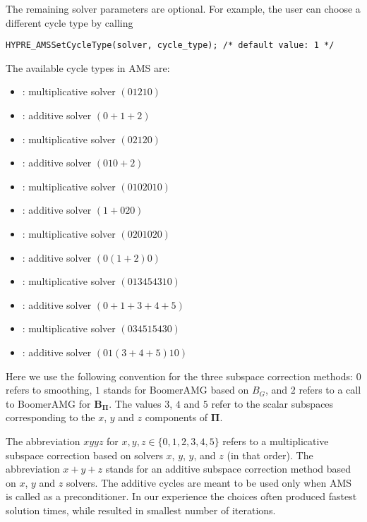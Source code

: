 The remaining solver parameters are optional.
For example, the user can choose a different cycle type by calling
\begin{display}\begin{verbatim}
HYPRE_AMSSetCycleType(solver, cycle_type); /* default value: 1 */
\end{verbatim}\end{display}

\noindent
The available cycle types in AMS are:
\begin{itemize}
\item {}: multiplicative solver $(01210)$
\item {}: additive solver $(0+1+2)$
\item {}: multiplicative solver $(02120)$
\item {}: additive solver $(010+2)$
\item {}: multiplicative solver $(0102010)$
\item {}: additive solver $(1+020)$
\item {}: multiplicative solver $(0201020)$
\item {}: additive solver $(0(1+2)0)$
\item {}: multiplicative solver $(013454310)$
\item {}: additive solver $(0+1+3+4+5)$
\item {}: multiplicative solver $(034515430)$
\item {}: additive solver $(01(3+4+5)10)$
\end{itemize}
Here we use the following convention for the
three subspace correction methods:
$0$ refers to smoothing, $1$ stands for BoomerAMG based on $B_G$, and
$2$ refers to a call to BoomerAMG for ${\mathbf B}_{{\mathbf \Pi}}$.
The values $3$, $4$ and $5$ refer to the scalar subspaces
corresponding to the $x$, $y$ and $z$ components of $\mathbf \Pi$.

The abbreviation $xyyz$  for $x,y,z \in \{0,1,2,3,4,5\}$
refers to a multiplicative subspace correction based on solvers $x$, $y$, $y$, and $z$ (in that order).
The abbreviation $x+y+z$ stands for an additive subspace correction method
based on $x$, $y$ and $z$ solvers.
The additive cycles are meant to be used only when AMS is called
as a preconditioner.
In our experience the choices  often produced
fastest solution times, while  resulted in smallest
number of iterations.

